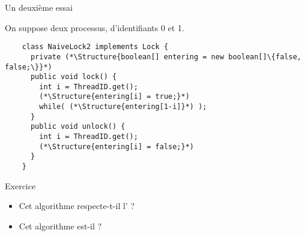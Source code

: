 
\begingroup

\begin{frame}[fragile]{Un deuxième essai}

  On suppose deux processus, d'identifiants 0 et 1. 

  \begin{lstlisting}
    class NaiveLock2 implements Lock {
      private (*\Structure{boolean[] entering = new boolean[]\{false, false;\}}*)
      public void lock() {
        int i = ThreadID.get();
        (*\Structure{entering[i] = true;}*) 
        while( (*\Structure{entering[1-i]}*) );
      }
      public void unlock() {
        int i = ThreadID.get();
        (*\Structure{entering[i] = false;}*)
      }
    }
  \end{lstlisting}

  \begin{exampleblock}{Exercice}
    \begin{itemize}
    \item Cet algorithme respecte-t-il l' ?
    \item Cet algorithme est-il  ?
    \end{itemize}
  \end{exampleblock}

\end{frame}

\endgroup
\endinput
